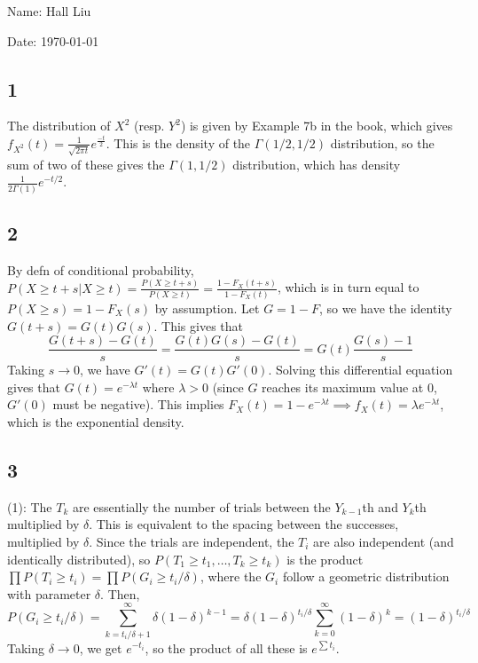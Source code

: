 \documentclass{article}
\begin{document}
Name: Hall Liu

Date: \today 
\vspace{1.5cm}

\subsection*{1}
The distribution of $X^2$ (resp. $Y^2$) is given by Example 7b in the book, which gives $f_{X^2}(t)=\frac{1}{\sqrt{2\pi t}}e^{\frac{-t}{2}}$. This is the density of the $\Gamma(1/2,1/2)$ distribution, so the sum of two of these gives the $\Gamma(1,1/2)$ distribution, which has density $\frac{1}{2\Gamma(1)}e^{-t/2}$.

\subsection*{2}
By defn of conditional probability, $P(X\geq t+s|X\geq t)=\frac{P(X\geq t+s)}{P(X\geq t)}=\frac{1-F_X(t+s)}{1-F_X(t)}$, which is in turn equal to $P(X\geq s)=1-F_X(s)$ by assumption. Let $G=1-F$, so we have the identity $G(t+s)=G(t)G(s)$. This gives that 
$$\frac{G(t+s)-G(t)}{s}=\frac{G(t)G(s)-G(t)}{s}=G(t)\frac{G(s)-1}{s}$$
Taking $s\to0$, we have $G'(t)=G(t)G'(0)$. Solving this differential equation gives that $G(t)=e^{-\lambda t}$ where $\lambda>0$ (since $G$ reaches its maximum value at $0$, $G'(0)$ must be negative). This implies $F_X(t)=1-e^{-\lambda t}\implies f_X(t)=\lambda e^{-\lambda t}$, which is the exponential density.
\subsection*{3}
(1): The $T_k$ are essentially the number of trials between the $Y_{k-1}$th and $Y_{k}$th multiplied by $\delta$. This is equivalent to the spacing between the successes, multiplied by $\delta$. Since the trials are independent, the $T_i$ are also independent (and identically distributed), so $P(T_1\geq t_1,\ldots,T_k\geq t_k)$ is the product $\prod P(T_i\geq t_i)=\prod P(G_i\geq t_i/\delta)$, where the $G_i$ follow a geometric distribution with parameter $\delta$. Then, 
$$P(G_i\geq t_i/\delta)=\sum_{k=t_i/\delta+1}^\infty \delta(1-\delta)^{k-1}=\delta(1-\delta)^{t_i/\delta}\sum_{k=0}^\infty(1-\delta)^k=(1-\delta)^{t_i/\delta}$$
Taking $\delta\to0$, we get $e^{-t_i}$, so the product of all these is $e^{\sum t_i}$.
\end{document}
